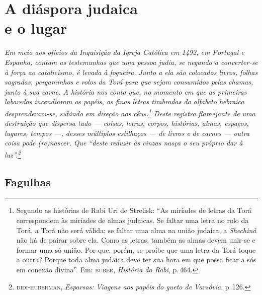 \part[A diáspora judaica e o lugar]{A diáspora judaica\\ e o lugar}

{
\thispagestyle{empty}

\mbox{}

\vspace{7.5cm}

\footnotesize
\noindent{}\emph{\noindent{}Em meio aos ofícios da Inquisição da Igreja Católica em 1492, em Portugal e Espanha, contam as testemunhas que uma pessoa judia, se negando a converter-se à força ao catolicismo, é levada à fogueira. Junto a ela são colocados livros, folhas sagradas, pergaminhos e rolos da Torá para que sejam consumidos pelas chamas, junto à sua carne. A história nos conta que, no momento em que as primeiras labaredas incendiaram os papéis, as finas letras timbradas do alfabeto hebraico desprenderam-se, subindo em direção aos céus.\footnote{Segundo as histórias de Rabi Uri de Strelisk: ``As miríades de letras da Torá correspondem às miríades de almas judaicas. Se faltar uma letra no rolo da Torá, a Torá não será válida; se faltar uma alma na união judaica, a \emph{Shechiná} não há de pairar sobre ela. Como as letras, também as almas devem unir-se e formar uma só união. Por que, porém, se proíbe que uma letra da Torá toque a outra? Porque toda alma judaica deve ter sua hora em que possa ficar a sós em conexão divina''. Em: \textsc{buber}, \emph{História do Rabi}, p.\,464.} Deste registro flamejante de uma destruição que dispersa tudo --- coisas, letras, corpos, histórias, almas, espaços, lugares, tempos ---, desses múltiplos estilhaços --- de livros e de carnes --- outra coisa pode (re)nascer. Que ``deste reduzir às cinzas nasça o seu próprio dar à luz''.\footnote{\textsc{didi-huberman}, \emph{Esparsas: Viagens aos papéis do gueto de Varsóvia}, p.\,126.}}
}



\pagebreak

\chapter{Fagulhas}

